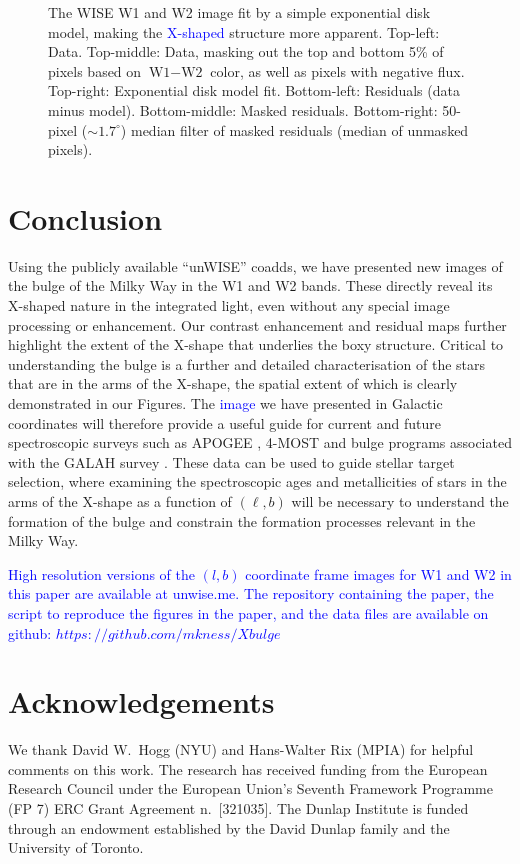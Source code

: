 \documentclass[12pt, preprint]{aastex}
\begin{document}
\begin{figure}[h!]
\caption{%
  The WISE W1 and W2 image fit by a simple exponential disk
  model, making the \textcolor{blue}{X-shaped} structure more apparent.
  Top-left: Data.  Top-middle: Data, masking out the top and bottom 5\%
  of pixels based on $\textrm{W1} - \textrm{W2}$ color, as well as pixels with negative flux.
  Top-right: Exponential disk model fit.
  Bottom-left: Residuals (data minus model).  Bottom-middle: Masked residuals.
  Bottom-right: 50-pixel ($\sim 1.7^{\circ}$) median filter of masked residuals (median of unmasked
  pixels).
  }
\label{fig:modfit}
\end{figure}




\section{Conclusion}

Using the publicly available ``unWISE'' coadds, we have presented new images of the bulge of the Milky Way in the W1 and W2 bands.  These directly reveal its X-shaped nature in the integrated light, even without any special image processing or enhancement. Our contrast enhancement and residual maps further highlight the extent of the X-shape that underlies the boxy structure. Critical to understanding the bulge is a further and detailed characterisation of the stars that are in the arms of the X-shape, the spatial extent of which is clearly demonstrated in our Figures. The \textcolor{blue}{image} we have presented in Galactic coordinates will therefore provide a useful guide for current and future spectroscopic surveys such as APOGEE \citep{Majewski2015}, 4-MOST \citep{4most} and bulge programs associated with the GALAH survey \citep{deSilva2015}. These data can be used to guide stellar target selection, where examining the spectroscopic ages \citep[e.g.][]{Martig2016, Ness2016} and metallicities of stars in the arms of the X-shape as a function of $(\ell,b)$ will be necessary to understand the formation of the bulge and constrain the formation processes relevant in the Milky Way. 

 \textcolor{blue}{High resolution versions of the $(l,b)$ coordinate frame images for W1 and W2 in this paper are available at unwise.me. The repository containing the paper, the script to reproduce the figures in the paper, and the data files are available on github: $https://github.com/mkness/Xbulge$}
 


\section{Acknowledgements} 
We thank David W.~Hogg (NYU) and Hans-Walter Rix (MPIA) for helpful
comments on this work.  The research has received funding from the
European Research Council under the European Union's Seventh Framework
Programme (FP 7) ERC Grant Agreement n.~[321035].
%
The Dunlap Institute is funded through an endowment established by the David Dunlap family and the University of Toronto.
\end{document}
